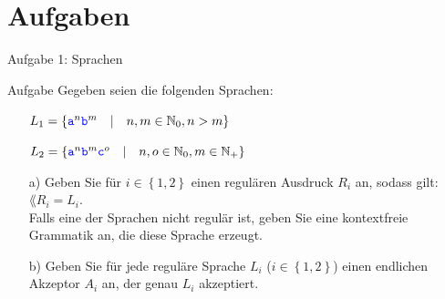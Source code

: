
\section{Aufgaben}
\begin{frame}{Aufgabe 1: Sprachen}
	\begin{block}{Aufgabe}
		Gegeben seien die folgenden Sprachen:
		\begin{itemize}
			\item[] $L_1 = \left\{\hbox{\textcolor{blue}{\texttt{a}}}^n\hbox{\textcolor{blue}{\texttt{b}}}^m \quad \middle| \quad n,m\in\mathbb{N}_0, n>m\right\}$
			\item[] $L_2 = \left\{\hbox{\textcolor{blue}{\texttt{a}}}^n \hbox{\textcolor{blue}{\texttt{b}}}^m \hbox{\textcolor{blue}{\texttt{c}}}^o \quad \middle| \quad n,o\in\mathbb{N}_0, m\in\mathbb{N}_+\right\}$
		\end{itemize}
		\begin{itemize}
			\item[a)] Geben Sie für $i\in\left\{1,2\right\}$ einen regulären Ausdruck $R_i$ an, sodass gilt: $\lang{R_i}=L_i$. \\
				Falls eine der Sprachen nicht regulär ist, geben Sie eine kontextfreie Grammatik an, die diese Sprache erzeugt.
			\item[b)] Geben Sie für jede reguläre Sprache $L_i$ ($i\in\left\{1,2\right\}$) einen endlichen Akzeptor $A_i$ an, der genau $L_i$ akzeptiert.
		\end{itemize}
	\end{block}
\end{frame}


